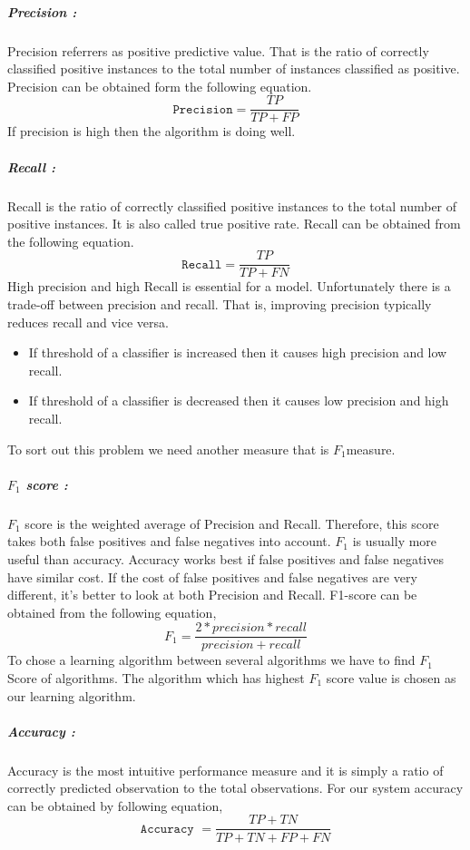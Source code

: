 \subparagraph{Precision :}
Precision referrers as positive predictive value. That is the ratio of
correctly classified positive instances to the total number of instances classified as positive. Precision can be obtained form  the following equation.
\begin{equation}
    \texttt{Precision} = \frac{TP}{TP+FP}
\end{equation}
If precision is high then the algorithm is doing well.

\subparagraph{Recall :}
Recall is the ratio of correctly classified positive instances to the total number of positive instances. It is also called true positive rate. Recall can be obtained from the following equation.
\begin{equation}
    \texttt{Recall} = \frac{TP}{TP+FN}
\end{equation}
High precision and high Recall is essential for a model. Unfortunately there is a trade-off between precision and recall. That is, improving precision typically reduces recall and vice versa. 
\begin{itemize}
    \item If threshold of a classifier is increased then it causes high precision and low recall.
    \item If threshold of a classifier is decreased then it causes low precision and high recall.
\end{itemize}
To sort out this problem we need another measure that is $F_1$measure.

\subparagraph{$F_1$ score :}
 $F_1$ score is the weighted average of Precision and Recall. Therefore, this score takes both false positives and false negatives into account. $F_1$ is usually more useful than accuracy. Accuracy works best if false positives and false negatives have similar cost. If the cost of false positives and false negatives are very different, it’s better to look at both Precision and Recall. F1-score can be obtained from the following equation,
 \begin{equation}
     F_1 = \frac{2*precision*recall}{precision+recall}
 \end{equation}
To chose a learning algorithm between several algorithms we have to find $F_1$ Score of algorithms. The algorithm which has highest $F_1$ score value is chosen as our learning algorithm.

\subparagraph{Accuracy :}
 Accuracy is the most intuitive performance measure and it is simply a ratio of correctly predicted observation to the total observations. For our system accuracy can be obtained by following equation,
\begin{equation}
    \texttt{Accuracy } = \frac{TP+TN}{TP+TN+FP+FN}
\end{equation}

